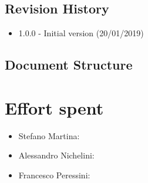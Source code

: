 \documentclass{article}
\begin{document}
\subsection{Revision History}
\begin{itemize}
	\item 1.0.0 - Initial version (20/01/2019)
\end{itemize}
\subsection{Document Structure}

\newpage
\section{Effort spent}

\begin{itemize}
	\item Stefano Martina: 
	\item Alessandro Nichelini: 
	\item Francesco Peressini: 
\end{itemize}
\end{document}
